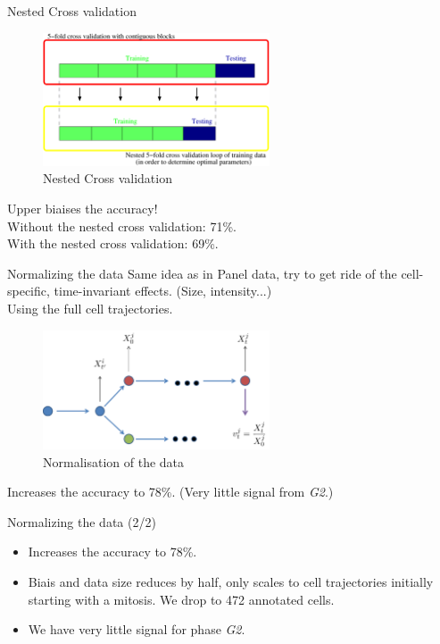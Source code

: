 \documentclass{beamer}
\begin{document}
\begin{frame}{Nested Cross validation}
\begin{figure}[!ht]
\centering
\includegraphics[width=0.6\textwidth]{Images/nest_cv.jpg}
\caption{Nested Cross validation}
\label{NestedCV}
\end{figure}
Upper biaises the accuracy! \\
Without the nested cross validation: 71\%. \\
With the nested cross validation: 69\%.
\end{frame}

\fi

\begin{frame}{Normalizing the data}
Same idea as in Panel data, try to get ride of the cell-specific, time-invariant effects. (Size, intensity...)\\
Using the full cell trajectories.

\begin{figure}[!ht]
\centering
\includegraphics[width=0.6\textwidth]{Images/test1.png}
\caption{Normalisation of the data}
\label{normalization}
\end{figure}

Increases the accuracy to 78\%. (Very little signal from \textit{G2}.)
\end{frame}

\iffalse

\begin{frame}{Normalizing the data (2/2)}
\begin{itemize}
\item Increases the accuracy to 78\%.
\item Biais and data size reduces by half, only scales to cell trajectories initially starting with a mitosis. We drop to 472 annotated cells.
\item We have very little signal for phase \textit{G2}. 
\end{itemize}
\end{frame}
\end{document}
